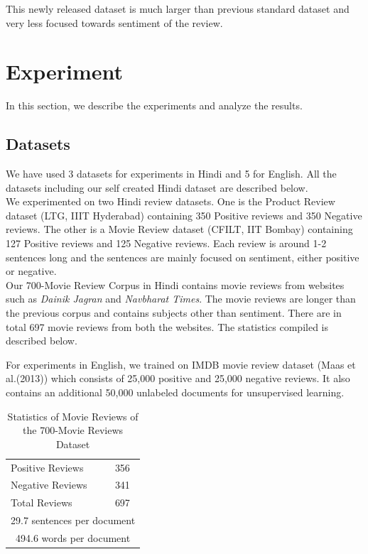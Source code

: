 \documentclass[11pt,a4paper]{article}
\begin{document}
This newly released dataset is much larger than previous standard dataset and very less focused towards sentiment of the review.

\section{Experiment}
\label{sec:experiment}
In this section, we describe the experiments and analyze the results.

\subsection{Datasets}
We have used 3 datasets for experiments in Hindi and 5 for English. All the datasets including our self created Hindi dataset are described below.\\
We experimented on two Hindi review datasets. One is the Product Review dataset (LTG, IIIT Hyderabad) containing 350 Positive reviews and 350 Negative reviews. The other is a Movie Review dataset (CFILT, IIT Bombay) containing 127 Positive reviews and 125 Negative reviews. Each review is around 1-2 sentences long and the sentences are mainly focused on sentiment, either positive or negative.\\
Our 700-Movie Review Corpus in Hindi contains movie reviews from websites such as \emph{Dainik Jagran} and \emph{Navbharat Times}. The movie reviews are longer than the previous corpus and contains subjects other than sentiment. There are in total 697 movie reviews from both the websites. The statistics compiled is described below.

For experiments in English, we trained on IMDB movie review dataset (Maas et al.(2013)) which consists of 25,000 positive and 25,000 negative reviews. It also contains an additional 50,000 unlabeled documents for unsupervised learning.
\begin {table}[h]
\centering
\begin{tabular}{ |l|l| }
\hline
Positive Reviews & 356 \\ 
Negative Reviews & 341 \\
Total Reviews & 697\\ \hline
\multicolumn{2}{|c|}{29.7 sentences per document} \\ \hline
\multicolumn{2}{|c|}{494.6 words per document} \\
\hline
\end{tabular}
\caption {Statistics of Movie Reviews of the 700-Movie Reviews Dataset}
\end{table}
\end{document}

